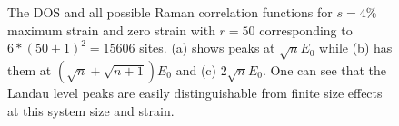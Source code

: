 \documentclass[reprint,amsmath,amssymb,aps,prl,groupedaddress,nofootinbib,superscriptaddress]{revtex4-1}
\newcommand{\1}{\mathds{1}}
\begin{document}
\begin{figure}
	\centering
	\caption{The DOS and all possible Raman correlation functions for $s=4$\% maximum strain and zero strain with $r=50$ corresponding to $6*(50+1)^2 = 15606$ sites. (a) shows peaks at $\sqrt{n}E_0$ while (b) has them at $(\sqrt{n} + \sqrt{n+1})E_0 $ and (c) $2 \sqrt{n} E_0$. One can see that the Landau level peaks are easily distinguishable from finite size effects at this system size and strain.}
	\label{basicPlots}
\end{figure}
\end{document}
